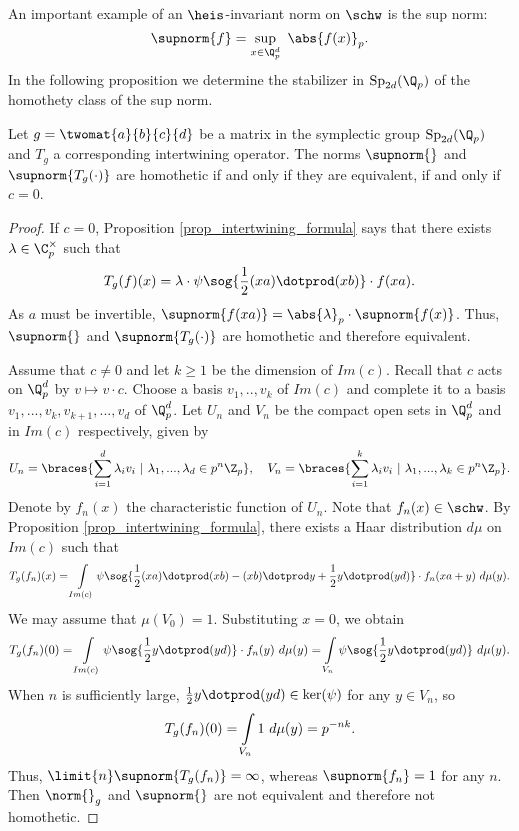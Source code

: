 An important example of an $\heis$-invariant norm on $\schw$ is the sup norm:
\[\supnorm{f}=\sup_{x\in \Q_p^d}\ \abs{f(x)}_p.\]
In the following proposition we determine the stabilizer in $\mathrm{Sp}_{2d}(\Q_p)$ of the homothety class of the sup norm.

\begin{prop}\label{prop_norms_Grassmannian}
Let $g=\twomat{a}{b}{c}{d}$ be a matrix in the symplectic group $\mathrm{Sp}_{2d}(\Q_p)$ and $T_g$ a corresponding intertwining operator.
The norms $\supnorm{}$ and $\supnorm{T_g(\cdot)}$ are homothetic if and only if they are equivalent, if and only if $c=0$.
\end{prop} 
    \begin{proof}
    If $c=0$, Proposition \ref{prop_intertwining_formula} says that there exists $\lambda\in\C_p^\times$ such that
    \[T_g(f)(x)=\lambda\cdot \psi\sog{\frac{1}{2}(xa)\dotprod(xb)}\cdot f(xa).\]
    As $a$ must be invertible, $\supnorm{f(xa)}=\abs{\lambda}_p\cdot\supnorm{f(x)}$.
    Thus, $\supnorm{}$ and $\supnorm{T_g(\cdot)}$ are homothetic and therefore equivalent.
    
    Assume that $c\neq 0$ and let $k\geq 1$ be the dimension of $Im(c)$.
    Recall that $c$ acts on $\Q_p^d$ by $v\mapsto v\cdot c$.
    Choose a basis $v_1,..,v_k$ of $Im(c)$ and complete it to a basis $v_1,...,v_k,v_{k+1},...,v_d$ of $\Q_p^d$.
    Let $U_n$ and $V_n$ be the compact open sets in $\Q_p^d$ and in $Im(c)$ respectively, given by
    \[U_n=\braces{\sum_{i=1}^d\lambda_iv_i\ |\ \lambda_1,...,\lambda_d\in p^n\Z_p},\ \ \ 
    V_n=\braces{\sum_{i=1}^k\lambda_iv_i\ |\ \lambda_1,...,\lambda_k\in p^n\Z_p}.\]
    Denote by $f_n(x)$ the characteristic function of $U_n$.
    Note that $f_n(x)\in\schw$.
    By Proposition \ref{prop_intertwining_formula}, there exists a Haar distribution $d\mu$ on $Im(c)$ such that
    \[T_g(f_n)(x)=\intop_{Im(c)}\psi\sog{\frac{1}{2}(xa)\dotprod(xb)-(xb)\dotprod y+\frac{1}{2}y\dotprod(yd)}\cdot f_n(xa+y)\ d\mu(y).\]
    We may assume that $\mu(V_0)=1$.
    Substituting $x=0$, we obtain
        \begin{align*}
        T_g(f_n)(0)
        =\intop_{Im(c)}\psi\sog{\frac{1}{2}y\dotprod(yd)}\cdot f_n(y)\ d\mu(y)
        =\intop_{V_n}\psi\sog{\frac{1}{2}y\dotprod(yd)}\ d\mu(y).
        \end{align*} 
    When $n$ is sufficiently large, $\frac{1}{2}y\dotprod (yd)\in \ker(\psi)$ for any $y\in V_n$, so
    \[T_g(f_n)(0)=\intop_{V_n}1\ d\mu(y)=p^{-nk}.\]
    Thus, $\limit{n}\supnorm{T_g(f_n)}=\infty$, whereas $\supnorm{f_n}=1$ for any $n$.
    Then $\norm{}_g$ and $\supnorm{}$ are not equivalent and therefore not homothetic.
    \end{proof} 

